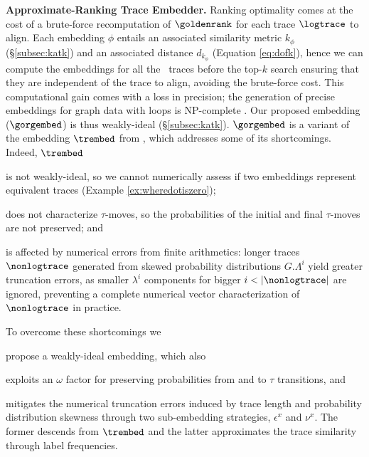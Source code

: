 \noindent
\textbf{Approximate-Ranking Trace Embedder.}\label{subsec:ate}
Ranking optimality comes at the cost of a brute-force recomputation of $\goldenrank$ for each trace $\logtrace$ to align.
Each embedding $\phi$ entails an associated similarity metric $k_\phi$ (\S\ref{subsec:katk}) and an associated
distance $d_{k_\phi}$ (Equation \ref{eq:dofk}), hence we can compute the embeddings for all the \unravelled\ traces
before the top-$k$ search ensuring that they are independent of the trace to align, avoiding the brute-force cost. 
This computational gain comes with a loss in precision; the generation of precise embeddings for graph data with loops is 
NP-complete \cite{GartnerFW03}. %
Our proposed embedding ($\gorgembed$) is thus weakly-ideal (\S\ref{subsec:katk}).
%
$\gorgembed$ is a variant of the embedding $\trembed$ from \cite{LodhiSSCW02}, which addresses some of its shortcomings.
Indeed, $\trembed$
\begin{alphalist}
	\item is not weakly-ideal, so we cannot numerically assess if two embeddings represent equivalent traces 
	(Example \ref{ex:wheredotiszero});
	\item does not characterize $\tau$-moves, so the probabilities of the initial and final $\tau$-moves are not preserved; and
	\item is affected by numerical errors from finite arithmetics: longer traces $\nonlogtrace$ generated from skewed probability 
	distributions $G.\Lambda^i$ yield greater truncation errors, as smaller $\lambda^i$ components for bigger 
	$i<|\nonlogtrace|$ are ignored, preventing a complete numerical vector characterization of  $\nonlogtrace$ in practice.
\end{alphalist}
%
To overcome these shortcomings we 
\begin{alphalist} 
	\item propose a weakly-ideal embedding, which also 
	\item exploits an $\omega$ factor for preserving probabilities from and to $\tau$ transitions, and 
	\item mitigates the numerical truncation errors induced by trace length and probability distribution skewness through two 
	sub-embedding strategies, $\epsilon^x$ and $\nu^x$. The former descends from $\trembed$ and the latter approximates 
	the trace similarity through label frequencies.
\end{alphalist}
